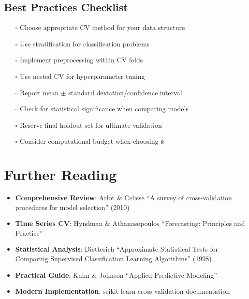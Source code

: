 \documentclass{article}
\begin{document}
\subsection{Best Practices Checklist}

\begin{itemize}
    \item[$\square$] Choose appropriate CV method for your data structure
    \item[$\square$] Use stratification for classification problems
    \item[$\square$] Implement preprocessing within CV folds
    \item[$\square$] Use nested CV for hyperparameter tuning
    \item[$\square$] Report mean $\pm$ standard deviation/confidence interval
    \item[$\square$] Check for statistical significance when comparing models
    \item[$\square$] Reserve final holdout set for ultimate validation
    \item[$\square$] Consider computational budget when choosing $k$
\end{itemize}

\section{Further Reading}

\begin{itemize}
    \item \textbf{Comprehensive Review}: Arlot \& Celisse ``A survey of cross-validation procedures for model selection'' (2010)
    \item \textbf{Time Series CV}: Hyndman \& Athanasopoulos ``Forecasting: Principles and Practice''
    \item \textbf{Statistical Analysis}: Dietterich ``Approximate Statistical Tests for Comparing Supervised Classification Learning Algorithms'' (1998)
    \item \textbf{Practical Guide}: Kuhn \& Johnson ``Applied Predictive Modeling''
    \item \textbf{Modern Implementation}: scikit-learn cross-validation documentation
\end{itemize}
\end{document}
